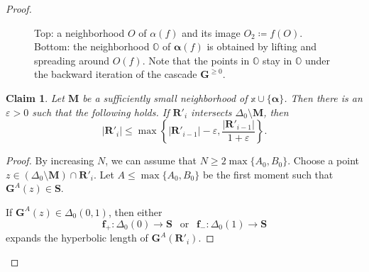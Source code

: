 \documentclass{amsart}
\renewcommand{\sp}{{\ \ }}
\newcommand{\1}{{\mathbb 1 }}
\newcommand{\bDelta}{{\mathbb{\Delta}}}
\newcommand{\bO}{{\mathbb{O}}}
\newcommand{\bM}{{\mathbf M}}
\newcommand{\bR}{{\mathbf R}}
\newcommand{\bS}{{\mathbf S}}
\newcommand{\bG}{{\mathbf G}}
\newcommand{\bbf}{{\mathbf f}}
\newcommand{\bxx}{{\mathbb{x}}}
\newtheorem{claim2}{Claim}
\theoremstyle{remark}
\numberwithin{equation}{section}
\theoremstyle{definition}
\newcommand{\balpha}{{\boldsymbol \alpha}}
\theoremstyle{nonumberbreak}
\begin{document}
\begin{proof}
\begin{figure}
{}
\caption{Top: a neighborhood $O$ of $\alpha(f)$ and its image $O_2\coloneqq f(O)$.  Bottom: the neighborhood $\bO$ of $\balpha(f)$ is obtained by lifting and spreading around $O(f)$. Note that the points in $\bO$ stay in $\bO$ under the backward iteration of the cascade $\bG^{\ge 0}$.}
\label{Fig:balpha:neigbb}
\end{figure} 




\begin{claim2} 
\label{cl2:bM}
 Let $\bM$ be a sufficiently small neighborhood of $\bxx\cup\{\balpha\}$. Then there is an $\varepsilon>0$ such that the following holds. If $\bR'_i$ intersects $\bDelta_0\setminus \bM$, then  
\[|\bR'_i |  \le \max \left\{ |\bR'_{i-1}|-\varepsilon , \frac{|\bR'_{i-1}|}{1+\varepsilon} \right\} .\]
\end{claim2} 
\begin{proof}
By increasing $N$, we can assume that $N\ge 2\max\{A_0,B_0\}$. Choose a point $z\in (\bDelta_0\setminus \bM)\cap \bR'_i$. Let $A\le \max\{A_0,B_0\} $ be the first moment such that $\bG^A(z)\in \bS$. 


If $\bG^A(z)\in \Delta_0(0,1)$, then either \[\bbf_+\colon \Delta_0(0)\to \bS\sp \text{ or }\sp \bbf_-\colon \Delta_0(1)\to \bS\] expands the hyperbolic length of $\bG^A(\bR'_i)$. 



\end{proof}
\end{proof}
\end{document}

